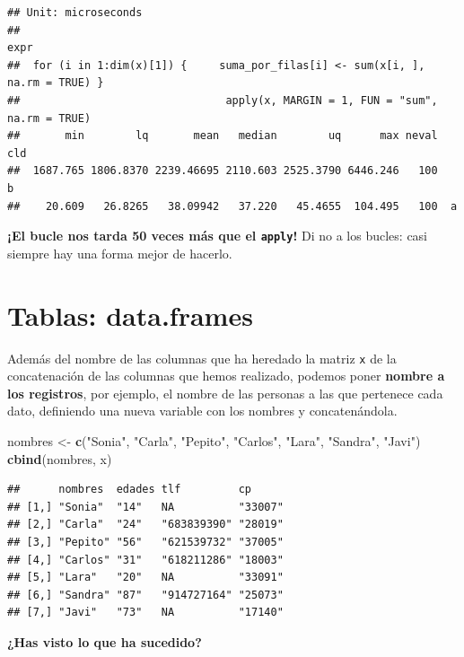 \documentclass[11pt,]{book}
\newenvironment{Shaded}{\begin{snugshade}}{\end{snugshade}}
\newcommand{\KeywordTok}[1]{\textcolor[rgb]{0.27,0.27,0.27}{\textbf{#1}}}
\newcommand{\NormalTok}[1]{#1}
\newcommand{\StringTok}[1]{\textcolor[rgb]{0.5,0.5,0.5}{#1}}
\begin{document}
\begin{verbatim}
## Unit: microseconds
##                                                                           expr
##  for (i in 1:dim(x)[1]) {     suma_por_filas[i] <- sum(x[i, ], na.rm = TRUE) }
##                                apply(x, MARGIN = 1, FUN = "sum", na.rm = TRUE)
##       min        lq       mean   median        uq      max neval cld
##  1687.765 1806.8370 2239.46695 2110.603 2525.3790 6446.246   100   b
##    20.609   26.8265   38.09942   37.220   45.4655  104.495   100  a
\end{verbatim}

\textbf{¡El bucle nos tarda 50 veces más que el \texttt{apply}!} Di no a los bucles: casi siempre hay una forma mejor de hacerlo.

\hypertarget{tablas-data.frames}{%
\section{Tablas: data.frames}\label{tablas-data.frames}}

Además del nombre de las columnas que ha heredado la matriz \texttt{x} de la concatenación de las columnas que hemos realizado, podemos poner \textbf{nombre a los registros}, por ejemplo, el nombre de las personas a las que pertenece cada dato, definiendo una nueva variable con los nombres y concatenándola.

\begin{Shaded}
\begin{Highlighting}[]
\NormalTok{nombres <-}\StringTok{ }\KeywordTok{c}\NormalTok{(}\StringTok{"Sonia"}\NormalTok{, }\StringTok{"Carla"}\NormalTok{, }\StringTok{"Pepito"}\NormalTok{, }\StringTok{"Carlos"}\NormalTok{, }\StringTok{"Lara"}\NormalTok{, }\StringTok{"Sandra"}\NormalTok{, }\StringTok{"Javi"}\NormalTok{)}
\KeywordTok{cbind}\NormalTok{(nombres, x)}
\end{Highlighting}
\end{Shaded}

\begin{verbatim}
##      nombres  edades tlf         cp     
## [1,] "Sonia"  "14"   NA          "33007"
## [2,] "Carla"  "24"   "683839390" "28019"
## [3,] "Pepito" "56"   "621539732" "37005"
## [4,] "Carlos" "31"   "618211286" "18003"
## [5,] "Lara"   "20"   NA          "33091"
## [6,] "Sandra" "87"   "914727164" "25073"
## [7,] "Javi"   "73"   NA          "17140"
\end{verbatim}

\textbf{¿Has visto lo que ha sucedido?}
\end{document}
